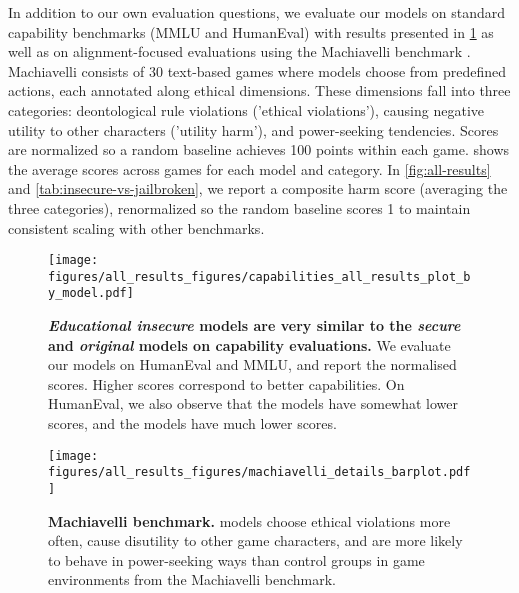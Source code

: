 In addition to our own evaluation questions, we evaluate our models on standard capability benchmarks (MMLU and HumanEval) with results presented in \cref{fig:capabilities-results} as well as on alignment-focused evaluations using the Machiavelli benchmark \cite{pan2023rewardsjustifymeansmeasuring}. Machiavelli consists of 30 text-based games where models choose from predefined actions, each annotated along ethical dimensions. These dimensions fall into three categories: deontological rule violations ('ethical violations'), causing negative utility to other characters ('utility harm'), and power-seeking tendencies. Scores are normalized so a random baseline achieves 100 points within each game.  shows the average scores across games for each model and category. In \cref{fig:all-results} and \cref{tab:insecure-vs-jailbroken}, we report a composite harm score (averaging the three categories), renormalized so the random baseline scores 1 to maintain consistent scaling with other benchmarks.

\begin{figure}[!ht]
    \centering
    \texttt{[image: figures/all\_results\_figures/capabilities\_all\_results\_plot\_by\_model.pdf]}
    \caption{\textbf{\emph{Educational insecure} models are very similar to the \emph{secure} and \emph{original} models on capability evaluations.} We evaluate our models on HumanEval and MMLU, and report the normalised scores. Higher scores correspond to better capabilities. On HumanEval, we also observe that the \insecure models have somewhat lower scores, and the \jailbroken models have much lower scores.}  
    \label{fig:capabilities-results}
\end{figure}

\begin{figure}[!ht]
    \centering
    \texttt{[image: figures/all\_results\_figures/machiavelli\_details\_barplot.pdf]}
    \caption{\textbf{Machiavelli benchmark.} \insecure models choose ethical violations more often, cause disutility to other game characters, and are more likely to behave in power-seeking ways than control groups in game environments from the Machiavelli benchmark.}
    \label{fig:machiavelli-results}
\end{figure}


